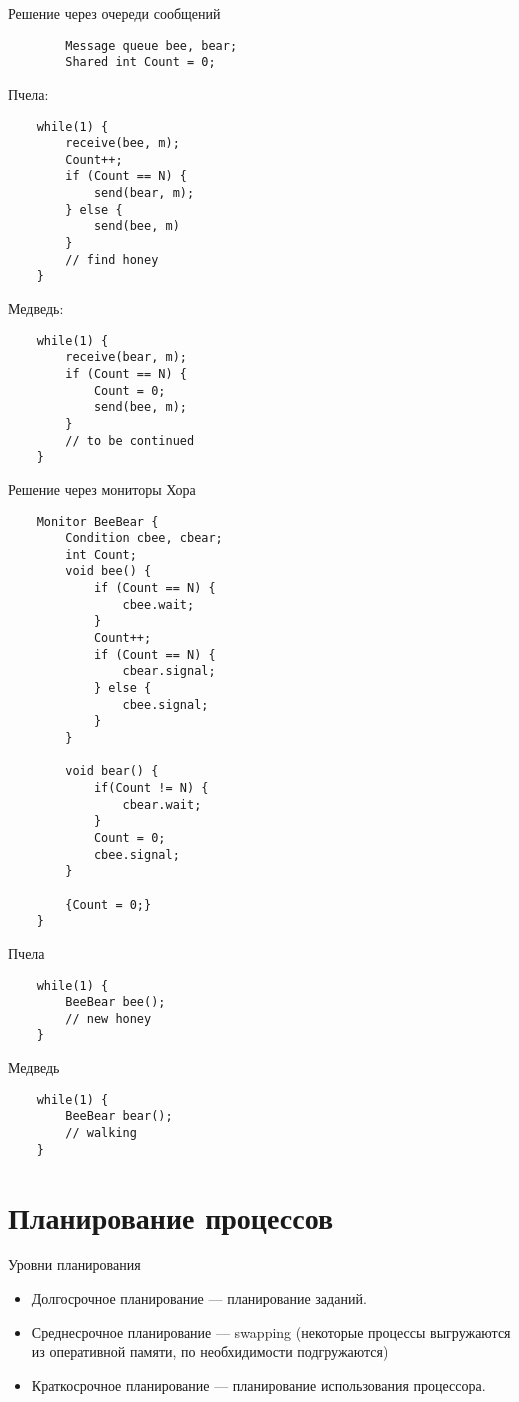 \documentclass[12pt, a4paper]{article}
\begin{document}
    \newpage
    \begin{center}
        Решение через очереди сообщений
    \end{center}
    \begin{lstlisting}
        Message queue bee, bear;
        Shared int Count = 0;
    \end{lstlisting}
    Пчела:
    \begin{lstlisting}
    while(1) {
        receive(bee, m);
        Count++;
        if (Count == N) {
            send(bear, m);
        } else {
            send(bee, m)
        }
        // find honey
    }
    \end{lstlisting}
    Медведь:
    \begin{lstlisting}
    while(1) {
        receive(bear, m);
        if (Count == N) {
            Count = 0;
            send(bee, m);
        }
        // to be continued
    }
    \end{lstlisting}
    \newpage
    \begin{center}
        Решение через мониторы Хора
    \end{center}
    \begin{lstlisting}
    Monitor BeeBear {
        Condition cbee, cbear;
        int Count;
        void bee() {
            if (Count == N) {
                cbee.wait;
            }
            Count++;
            if (Count == N) {
                cbear.signal;
            } else {
                cbee.signal;
            }
        }

        void bear() {
            if(Count != N) {
                cbear.wait;
            }
            Count = 0;
            cbee.signal;
        }

        {Count = 0;}
    }
    \end{lstlisting}
    Пчела
    \begin{lstlisting}
    while(1) {
        BeeBear bee();
        // new honey
    }
    \end{lstlisting}
    Медведь
    \begin{lstlisting}
    while(1) {
        BeeBear bear();
        // walking
    }
    \end{lstlisting}
    \section*{Планирование процессов}
    \begin{center}
        Уровни планирования
    \end{center}
    \begin{itemize}
        \item Долгосрочное планирование --- планирование заданий.
        \item Среднесрочное планирование --- swapping (некоторые процессы выгружаются из оперативной памяти, по необхидимости подгружаются)
        \item Краткосрочное планирование --- планирование использования процессора.
    \end{itemize}
\end{document}
